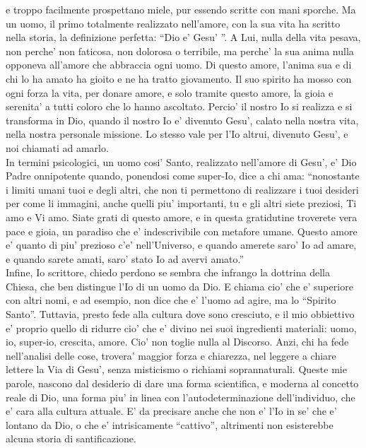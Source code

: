 e troppo facilmente prospettano miele,
pur essendo scritte con mani sporche.
Ma un uomo, 
il primo totalmente realizzato nell'amore,
con la sua vita ha scritto nella storia,
la definizione perfetta: ``Dio e' Gesu' ''.
A Lui, nulla della vita pesava,
non perche' non faticosa, non dolorosa o terribile,
ma perche' la sua anima nulla opponeva
all'amore che abbraccia ogni uomo.
Di questo amore, l'anima sua e di chi lo ha amato
ha gioito e ne ha tratto giovamento.
Il suo spirito ha mosso con ogni forza la vita,
per donare amore, e solo tramite questo amore,
la gioia e serenita' a tutti coloro
che lo hanno ascoltato.
Percio' il nostro Io si realizza e si transforma in Dio, 
quando il nostro Io e' divenuto Gesu',
calato nella nostra vita,
nella nostra personale missione.
Lo stesso vale per l'Io altrui, divenuto Gesu',
e noi chiamati ad amarlo.
\\
In termini psicologici, un uomo cosi' Santo,
realizzato nell'amore di Gesu', e' Dio Padre onnipotente
quando, ponendosi come super-Io, dice a chi ama:
``nonostante i limiti umani tuoi e degli altri,
che non ti permettono di realizzare i tuoi desideri
per come li immagini, anche quelli piu' importanti,
tu e gli altri siete preziosi,
Ti amo e Vi amo.
Siate grati di questo amore,
e in questa gratidutine
troverete vera pace e gioia,
un paradiso che e' indescrivibile con metafore umane.
Questo amore e' quanto di piu' prezioso 
c'e' nell'Universo,
e quando amerete saro' Io ad amare,
e quando sarete amati, saro' stato Io ad avervi amato.''
\\
Infine, Io scrittore, chiedo perdono 
se sembra che infrango la dottrina della Chiesa,
che ben distingue l'Io di un uomo da Dio. 
E chiama cio' che e' superiore con altri nomi, 
e ad esempio, non dice  che e' l'uomo ad agire,
ma lo ``Spirito Santo''.
Tuttavia, presto fede alla cultura dove sono cresciuto,
e il mio obbiettivo e' proprio quello di ridurre 
cio' che e' divino nei suoi ingredienti materiali: 
uomo, io, super-io, crescita, amore. 
Cio' non toglie nulla al Discorso. Anzi,
chi ha fede nell'analisi delle cose, trovera' 
maggior forza e chiarezza, nel leggere a chiare lettere
la Via di Gesu', senza misticismo o richiami soprannaturali.
Queste mie parole, nascono dal desiderio 
di dare una forma scientifica, e moderna 
al concetto reale di Dio,
una forma piu' in linea con l'autodeterminazione
dell'individuo, che e' cara alla cultura attuale.
E' da precisare anche che non e' l'Io in se'
che e' lontano da Dio, o che e' intrisicamente ``cattivo'',
altrimenti non esisterebbe alcuna storia di santificazione.
